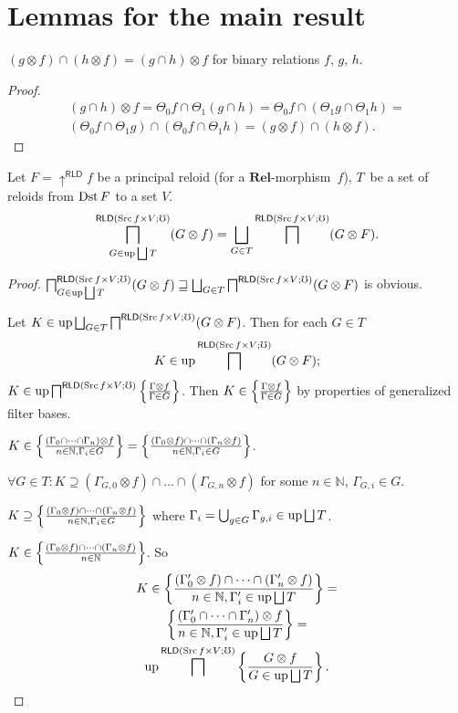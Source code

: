 \section{Lemmas for the main result}
\begin{lem}
$(g\otimes f)\cap(h\otimes f)=(g\cap h)\otimes f$ for binary relations
$f$, $g$, $h$.\end{lem}
\begin{proof}
~
\begin{multline*}
(g\cap h)\otimes f=\Theta_{0}f\cap\Theta_{1}(g\cap h)=\Theta_{0}f\cap(\Theta_{1}g\cap\Theta_{1}h)=\\
(\Theta_{0}f\cap\Theta_{1}g)\cap(\Theta_{0}f\cap\Theta_{1}h)=(g\otimes f)\cap(h\otimes f).
\end{multline*}
\end{proof}
\begin{lem}
Let $F=\uparrow^{\mathsf{RLD}}f$ be a principal reloid (for a $\mathbf{Rel}$-morphism~$f$),
$T$~be a set of reloids from $\operatorname{Dst} F$ to a set $V$.
\[
\bigsqcap_{G\in\operatorname{up}\bigsqcup T}^{\mathsf{RLD}(\operatorname{Src} f\times V;\mho)}(G\otimes f)=\bigsqcup_{G\in T}\bigsqcap^{\mathsf{RLD}(\operatorname{Src} f\times V;\mho)}(G\otimes F).
\]
\end{lem}
\begin{proof}
$\bigsqcap_{G\in\operatorname{up}\bigsqcup T}^{\mathsf{RLD}(\operatorname{Src} f\times V;\mho)}(G\otimes f)\sqsupseteq\bigsqcup_{G\in T}\bigsqcap^{\mathsf{RLD}(\operatorname{Src} f\times V;\mho)}(G\otimes F)$
is obvious.

Let $K\in\operatorname{up}\bigsqcup_{G\in T}\bigsqcap^{\mathsf{RLD}(\operatorname{Src} f\times V;\mho)}(G\otimes F)$.
Then for each $G\in T$
\[
K\in\operatorname{up}\bigsqcap^{\mathsf{RLD}(\operatorname{Src} f\times V;\mho)}(G\otimes F);
\]
$K\in\operatorname{up}\bigsqcap^{\mathsf{RLD}(\operatorname{Src} f\times V;\mho)}\left\{ \frac{\Gamma\otimes f}{\Gamma\in G}\right\}$.
Then $K\in\left\{ \frac{\Gamma\otimes f}{\Gamma\in G}\right\}$ by properties of
generalized filter bases.

$K\in\left\{ \frac{(\Gamma_{0}\cap\dots\cap\Gamma_{n})\otimes f}{n\in\mathbb{N},\Gamma_{i}\in G}\right\}=\left\{ \frac{(\Gamma_{0}\otimes f)\cap\dots\cap(\Gamma_{n}\otimes f)}{n\in\mathbb{N},\Gamma_{i}\in G}\right\}$.

$\forall G\in T:K\supseteq(\Gamma_{G,0}\otimes f)\cap\dots\cap(\Gamma_{G,n}\otimes f)$
for some $n\in\mathbb{N}$, $\Gamma_{G,i}\in G$.

$K\supseteq\left\{ \frac{(\Gamma_{0}\otimes f)\cap\dots\cap(\Gamma_{n}\otimes f)}{n\in\mathbb{N},\Gamma_{i}\in G}\right\}$
where $\Gamma_{i}=\bigcup_{g\in G}\Gamma_{g,i}\in\operatorname{up}\bigsqcup T$.

$K\in\left\{ \frac{(\Gamma_{0}\otimes f)\cap\dots\cap(\Gamma_{n}\otimes f)}{n\in\mathbb{N}}\right\}$.
So
\begin{multline*}
K\in\left\{ \frac{(\Gamma'_{0}\otimes f)\cap\dots\cap(\Gamma'_{n}\otimes f)}{n\in\mathbb{N},\Gamma'_{i}\in\operatorname{up}\bigsqcup T}\right\}=\\
\left\{ \frac{(\Gamma'_{0}\cap\dots\cap\Gamma'_{n})\otimes f}{n\in\mathbb{N},\Gamma'_{i}\in\operatorname{up}\bigsqcup T}\right\}=\\
\operatorname{up}\bigsqcap^{\mathsf{RLD}(\operatorname{Src} f\times V;\mho)}\left\{ \frac{G\otimes f}{G\in\operatorname{up}\bigsqcup T}\right\}.
\end{multline*}

\end{proof}

